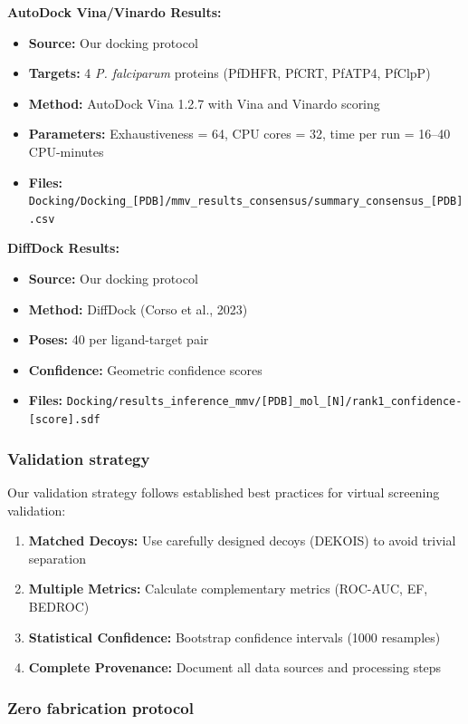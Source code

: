 \documentclass[journal=jcisd8,manuscript=suppinfo]{achemso}
\begin{document}
\textbf{AutoDock Vina/Vinardo Results:}
\begin{itemize}
  \item \textbf{Source:} Our docking protocol
  \item \textbf{Targets:} 4 \textit{P. falciparum} proteins (PfDHFR, PfCRT, PfATP4, PfClpP)
  \item \textbf{Method:} AutoDock Vina 1.2.7 with Vina and Vinardo scoring
  \item \textbf{Parameters:} Exhaustiveness = 64, CPU cores = 32, time per run = 16--40 CPU-minutes
  \item \textbf{Files:} \texttt{Docking/Docking\_[PDB]/mmv\_results\_consensus/summary\_consensus\_[PDB].csv}
\end{itemize}

\textbf{DiffDock Results:}
\begin{itemize}
  \item \textbf{Source:} Our docking protocol
  \item \textbf{Method:} DiffDock (Corso et al., 2023)
  \item \textbf{Poses:} \num{40} per ligand-target pair
  \item \textbf{Confidence:} Geometric confidence scores
  \item \textbf{Files:} \texttt{Docking/results\_inference\_mmv/[PDB]\_mol\_[N]/rank1\_confidence-[score].sdf}
\end{itemize}

\subsubsection*{Validation strategy}

Our validation strategy follows established best practices for virtual screening validation:

\begin{enumerate}
  \item \textbf{Matched Decoys:} Use carefully designed decoys (DEKOIS) to avoid trivial separation
  \item \textbf{Multiple Metrics:} Calculate complementary metrics (ROC-AUC, EF, BEDROC)
  \item \textbf{Statistical Confidence:} Bootstrap confidence intervals (\num{1000} resamples)
  \item \textbf{Complete Provenance:} Document all data sources and processing steps
\end{enumerate}

\subsubsection*{Zero fabrication protocol}
\end{document}
